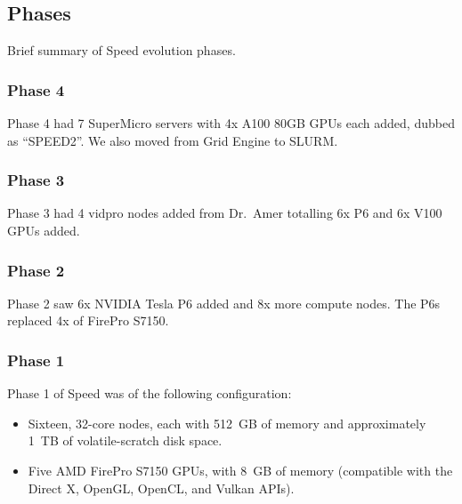 \subsection{Phases}
\label{sect:phases}

Brief summary of Speed evolution phases.

\subsubsection{Phase 4}

Phase 4 had 7 SuperMicro servers with 4x A100 80GB GPUs each added,
dubbed as ``SPEED2''. We also moved from Grid Engine to SLURM.

\subsubsection{Phase 3}

Phase 3 had 4 vidpro nodes added from Dr.~Amer totalling 6x P6 and 6x V100
GPUs added.

\subsubsection{Phase 2}

Phase 2 saw 6x NVIDIA Tesla P6 added and 8x more compute nodes.
The P6s replaced 4x of FirePro S7150.

\subsubsection{Phase 1}

Phase 1 of Speed was of the following configuration:

\begin{itemize}
\item
Sixteen, 32-core nodes, each with 512~GB of memory and approximately 1~TB of volatile-scratch disk space. 
\item
Five AMD FirePro S7150 GPUs, with 8~GB of memory (compatible with the Direct X, OpenGL, OpenCL, and Vulkan APIs). 
\end{itemize}